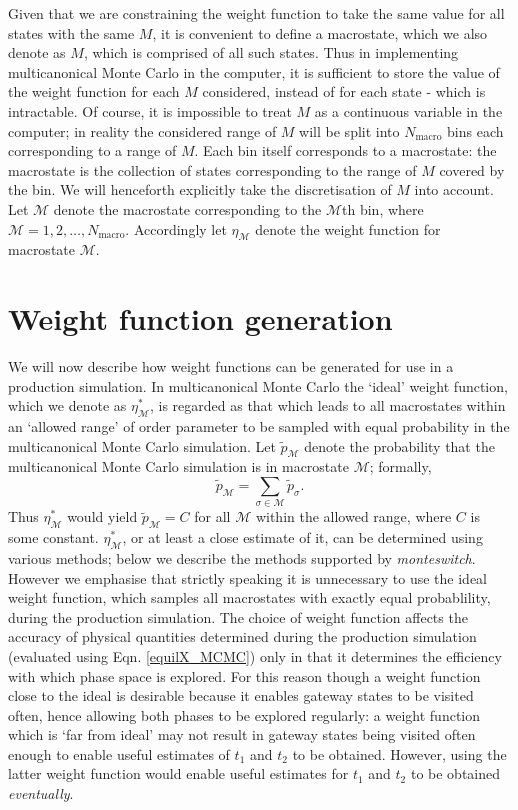 \documentclass{report}
\begin{document}
Given that we are constraining the weight function to take the same value for all states with the same $M$, it is convenient to define a
macrostate, which we also denote as $M$, which is comprised of all such states. Thus in implementing multicanonical Monte Carlo
in the computer, it is sufficient to store the value of the weight function for each $M$ considered, instead of for each state - which is
intractable. Of course, it is impossible to treat $M$ as a continuous variable in the computer; in reality the considered range of $M$ will
be split into $N_{\text{macro}}$ bins each corresponding to a range of $M$. Each bin itself corresponds to a macrostate: the macrostate is the
collection of states corresponding to the range of $M$ covered by the bin. We will henceforth explicitly take the discretisation of $M$ into
account. Let $\mathcal{M}$ denote the macrostate corresponding to the $\mathcal{M}$th bin, where $\mathcal{M}=1,2,\dotsc,N_{\text{macro}}$.
Accordingly let $\eta_{\mathcal{M}}$ denote the weight function for macrostate $\mathcal{M}$.

\section{Weight function generation}\label{sec:weight_generation}
We will now describe how weight functions can be generated for use in a production simulation.
In multicanonical Monte Carlo the `ideal' weight function, which we denote as $\eta_{\mathcal{M}}^*$, is regarded as that which leads to 
all macrostates within an `allowed range' of order parameter to be sampled with equal probability in the multicanonical Monte Carlo simulation.
Let $\tilde{p}_{\mathcal{M}}$ denote the probability that the multicanonical Monte Carlo simulation is in macrostate $\mathcal{M}$; formally,
\begin{equation}
\tilde{p}_{\mathcal{M}}=\sum_{\sigma\in\mathcal{M}}\tilde{p}_{\sigma}.
\end{equation}
Thus $\eta_{\mathcal{M}}^*$ would yield $\tilde{p}_{\mathcal{M}}=C$ for all $\mathcal{M}$ within the allowed range, where $C$ is some constant.
$\eta^*_{\mathcal{M}}$, or at least a close estimate of it, can be determined using various methods; below we 
describe the methods supported by \emph{monteswitch}. 
However we emphasise that strictly speaking it is unnecessary to use the ideal weight function, which samples all macrostates with exactly equal 
probablility, during the
production simulation. The choice of weight function affects the accuracy of physical quantities determined during the production simulation
(evaluated using Eqn. \eqref{equilX_MCMC}) only in that it determines the efficiency with which phase space is explored. For this reason though a
weight function close
to the ideal is desirable because it enables gateway states to be visited often, hence allowing both phases to be explored regularly: 
a weight function which is `far from ideal' may not result in gateway states being visited often enough to enable useful estimates
of $t_1$ and $t_2$ to be obtained. However, using the latter weight function would enable useful estimates for $t_1$ and $t_2$ to be obtained
\emph{eventually}.
\end{document}
